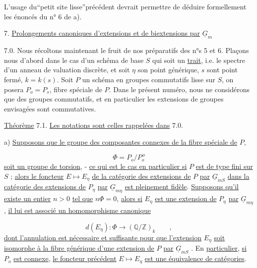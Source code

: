 L'usage du``petit site lisse''précédent devrait permettre de déduire formellement les énoncés du n° 6 de a).




7. \underline{Prolongements canoniques d'extensions et de biextensions par} $\underline{G}_m$

7.0. Nous récoltons maintenant le fruit de nos préparatifs des n°s 5 et 6. Plaçons nous d'abord dans le cas d'un schéma de base $S$ qui soit un \underline{trait}, i.e. le spectre d'un anneau de valuation discrète, et soit $\eta$ son point générique, $s$ sont point fermé, $k = k(s)$. Soit $P$ un schéma en groupes commutatifs lisse sur $S$, on posera $P_o = P_s$, fibre spéciale de $P$. Dans le présent numéro, nous ne considérons que des groupes commutatifs, et en particulier les extensions de groupes envisagées sont commutatives.

\underline{Théorème} 7.1. \underline{Les notations sont celles rappelées dans} 7.0.

a) \underline{Supposons que le groupe des composantes connexes de la fibre spéciale de} $P$,

\begin{equation*}
\Phi = P_o/P_o^{\,o}
\end{equation*}
\underline{soit un groupe de torsion}, - \underline{ce qui est le cas en particulier si} $P$ \underline{est de type fini sur} $S$ ; \underline{alors le foncteur} $E \longmapsto E_\eta$ \underline{de la catégorie des extensions de} $P$ \underline{par} $\underline{G}_{mS}$ \underline{dans la catégorie des extensions de} $P_\eta$ \underline{par} $\underline{G}_{m\eta}$ \underline{est pleinement fidèle}. \underline{Supposons qu'il existe un entier} $n > 0$ \underline{tel que} $n\Phi = 0$, \underline{alors si} $E_\eta$ \underline{est une extension de} $P_\eta$ \underline{par} $\underline{G}_{m\eta}$ , \underline{il lui est associé un homomorphisme canonique}

\begin{equation}\tag{7.1.1}
d(E_\eta) : \Phi \longrightarrow (\mathbb{Q}/\mathbb{Z})_k \qquad ,
\end{equation}
\underline{dont l'annulation est nécessaire et suffisante pour que l'extension} $E_\eta$ \underline{soit isomorphe à la fibre générique d'une extension de} $P$ \underline{par} $\underline{G}_{mS}$ . En \underline{particulier}, \underline{si} $P_o$ \underline{est connexe}, \underline{le foncteur précédent} $E \longmapsto E_\eta$ \underline{est une équivalence de catégories}.


